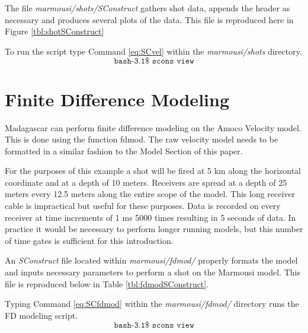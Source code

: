 The file \emph{marmousi/shots/SConstruct} gathers shot data, appends the header as necessary and produces several plots of the data.  This file is reproduced here in Figure \ref{tbl:shotSConstruct}


{
\tiny

\normalsize
}


To run the script type Command \ref{eq:SCvel} within the \emph{marmousi\slash shots} directory.
\begin{equation}\label{eq:SCvel} \texttt{bash-3.1\$\ scons\ view} \end{equation}


\section{Finite Difference Modeling}
Madagascar can perform finite difference modeling on the Amoco Velocity model.  This is done using the function fdmod.
The raw velocity model needs to be formatted in a similar fashion to the Model Section of this paper.

For the purposes of this example a shot will be fired at 5 km along the horizontal coordinate and at a depth of 10 meters.  Receivers are
spread at a depth of 25 meters every 12.5 meters along the entire scope of the model.  This long receiver cable is impractical but useful for these
purposes.  Data is recorded on every receiver at time increments of 1 ms 5000 times resulting in 5 seconds of data.  In practice it would be 
necessary to perform longer running models, but this number of time gates is sufficient for this introduction. 

An \emph{SConstruct} file located within \emph{marmousi/fdmod/} properly formats the model and inputs necessary parameters to perform a shot 
on the Marmousi model.  This file is reproduced below in Table \ref{tbl:fdmodSConstruct}.

{
\tiny

\normalsize
}

Typing Command \ref{eq:SCfdmod} within the \emph{marmousi/fdmod/} directory runs the FD modeling script.
\begin{equation}\label{eq:SCfdmod} \texttt{bash-3.1\$\ scons\ view} \end{equation}


